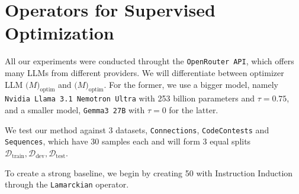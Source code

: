 \section{Operators for Supervised Optimization}
All our experiments were conducted throught the \texttt{OpenRouter API}, which offers many LLMs from different providers.
We will differentiate between optimizer LLM $\mathcal(M)_{\text{optim}}$ and $\mathcal(M)_{\text{optim}}$.
For the former, we use a bigger model, namely \texttt{Nvidia Llama 3.1 Nemotron Ultra} with 253 billion parameters and $\tau=0.75$, and a smaller model, \texttt{Gemma3 27B} with $\tau=0$
for the latter.

We test our method against 3 datasets, \texttt{Connections}, \texttt{CodeContests} and \texttt{Sequences}, which have 30 samples each 
and will form 3 equal splits $\mathcal{D}_{\text{train}}, \mathcal{D}_{\text{dev}}, \mathcal{D}_{\text{test}}$.

To create a strong baseline, we begin by creating 50 with Instruction Induction through the \texttt{Lamarckian} operator.

